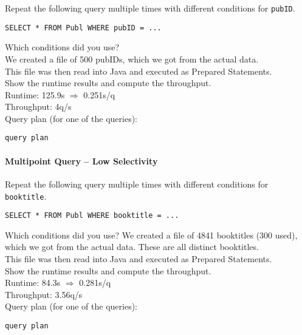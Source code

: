 \documentclass[11pt]{scrartcl}
\begin{document}
Repeat the following query multiple times with different conditions for {\tt pubID}.

{\small
\begin{verbatim}
SELECT * FROM Publ WHERE pubID = ...
\end{verbatim}
}

\noindent
Which conditions did you use?\\
We created a file of 500 pubIDs, which we got from the actual data.\\
This file was then read into Java and executed as Prepared Statements.\\

\smallskip\noindent
Show the runtime results and compute the throughput.\\
Runtime: 125.9s $\Rightarrow$ 0.251s/q\\
Throughput: 4q/s\\

\smallskip\noindent
Query plan (for one of the queries):
{\small
\begin{verbatim}
query plan
\end{verbatim}
}


\paragraph{Multipoint Query -- Low Selectivity}

Repeat the following query multiple times with different conditions for {\tt booktitle}.

{\small
\begin{verbatim}
SELECT * FROM Publ WHERE booktitle = ...
\end{verbatim}
}

\noindent
Which conditions did you use?
We created a file of 4841 booktitles (300 used), which we got from the actual data. These are all distinct booktitles.\\
This file was then read into Java and executed as Prepared Statements.\\

\smallskip\noindent
Show the runtime results and compute the throughput.\\
Runtime: 84.3s $\Rightarrow$ 0.281s/q\\
Throughput: 3.56q/s\\

\smallskip\noindent
Query plan (for one of the queries):
{\small
\begin{verbatim}
query plan
\end{verbatim}
}
\end{document}
